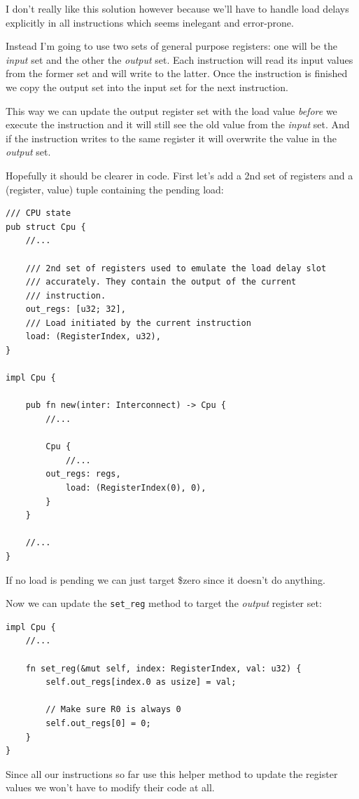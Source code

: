 \documentclass[a4paper]{article}
\newcommand{\code}[1] {\texttt{#1}}
\begin{document}
I don't really like this solution however because we'll have to handle
load delays explicitly in all instructions which seems inelegant and
error-prone.

Instead I'm going to use two sets of general purpose registers: one
will be the \emph{input} set and the other the \emph{output} set. Each
instruction will read its input values from the former set and will
write to the latter. Once the instruction is finished we copy the
output set into the input set for the next instruction.

This way we can update the output register set with the load value
\emph{before} we execute the instruction and it will still see the old
value from the \emph{input} set. And if the instruction writes to the
same register it will overwrite the value in the \emph{output} set.

Hopefully it should be clearer in code. First let's add a 2nd set of
registers and a (register, value) tuple containing the pending load:

\begin{lstlisting}
/// CPU state
pub struct Cpu {
    //...

    /// 2nd set of registers used to emulate the load delay slot
    /// accurately. They contain the output of the current
    /// instruction.
    out_regs: [u32; 32],
    /// Load initiated by the current instruction
    load: (RegisterIndex, u32),
}

impl Cpu {

    pub fn new(inter: Interconnect) -> Cpu {
        //...

        Cpu {
            //...
	    out_regs: regs,
            load: (RegisterIndex(0), 0),
        }
    }

    //...
}
\end{lstlisting}

If no load is pending we can just target \$zero since it doesn't do
anything.

Now we can update the \code{set\_reg} method to target the
\emph{output} register set:

\begin{lstlisting}
impl Cpu {
    //...

    fn set_reg(&mut self, index: RegisterIndex, val: u32) {
        self.out_regs[index.0 as usize] = val;

        // Make sure R0 is always 0
        self.out_regs[0] = 0;
    }
}
\end{lstlisting}

Since all our instructions so far use this helper method to update the
register values we won't have to modify their code at all.
\end{document}
